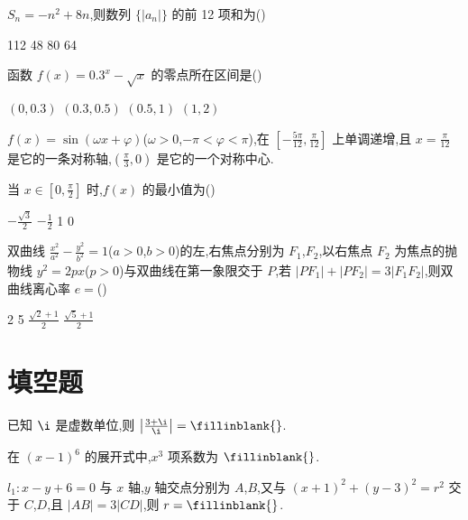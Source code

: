 \begin{problem}
\(S_n=-n^2+8n\),则数列 \(\{|a_n|\}\) 的前 12 项和为(\quad)

\choices
    {112}
    {48}
    {80}
    {64}
\end{problem}

\begin{problem}
函数 \(f(x)=0.3^x-\sqrt{x}\) 的零点所在区间是(\quad)

\choices
    {\((0,0.3)\)}
    {\((0.3,0.5)\)}
    {\((0.5,1)\)}
    {\((1,2)\)}
\end{problem}

\begin{problem}
\(f(x)=\sin(\omega x+\varphi)\)(\(\omega>0\),\(-\pi<\varphi<\pi\)),在 \(\left[-\frac{5\pi}{12},\frac{\pi}{12}\right]\) 上单调递增,且 \(x=\frac{\pi}{12}\) 是它的一条对称轴,\((\frac{\pi}{3},0)\) 是它的一个对称中心.

当 \(x\in[0,\frac{\pi}{2}]\) 时,\(f(x)\) 的最小值为(\quad)

\choices
    {\(-\frac{\sqrt3}{2}\)}
    {\(-\frac12\)}
    {1}
    {0}
\end{problem}

\begin{problem}
双曲线 \(\frac{x^2}{a^2}-\frac{y^2}{b^2}=1\)(\(a>0\),\(b>0\))的左,右焦点分别为 \(F_1\),\(F_2\),以右焦点 \(F_2\) 为焦点的抛物线 \(y^2=2px\)(\(p>0\))与双曲线在第一象限交于 \(P\),若 \(|PF_1|+|PF_2|=3|F_1F_2|\),则双曲线离心率 \(e=\)(\quad)

\choices
    {2}
    {5}
    {\(\frac{\sqrt2+1}{2}\)}
    {\(\frac{\sqrt5+1}{2}\)}
\end{problem}

\section{填空题}

\begin{problem}
已知 \(\i\) 是虚数单位,则 \(\left|\frac{3+\i}{\i}\right|=\fillinblank{}\).
\end{problem}

\begin{problem}
在 \((x-1)^6\) 的展开式中,\(x^3\) 项系数为 \(\fillinblank{}\).
\end{problem}

\begin{problem}
\(l_1:x-y+6=0\) 与 \(x\) 轴,\(y\) 轴交点分别为 \(A\),\(B\),又与 \((x+1)^2+(y-3)^2=r^2\) 交于 \(C\),\(D\),且 \(|AB|=3|CD|\),则 \(r=\fillinblank{}\).
\end{problem}

